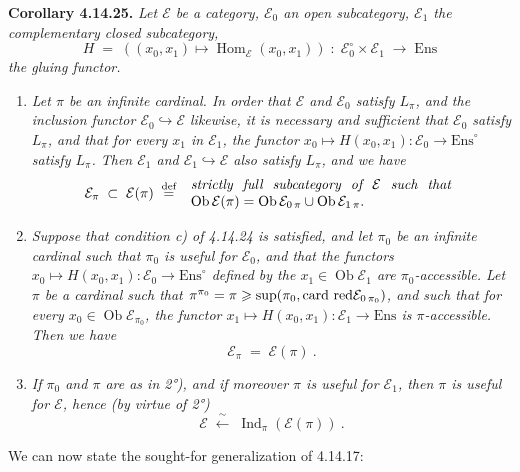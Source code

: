 \documentclass[11pt]{article}
\newcommand{\printedpage}[1]{\marginpar{\footnotesize p.~#1}}
\newcommand{\msp}[1]{\marginpar{\footnotesize [#1]}}
\newcommand{\cE}{\mathcal{E}}
\newcommand{\Ob}{\operatorname{Ob}}
\newcommand{\Hom}{\operatorname{Hom}}
\newcommand{\Ind}{\operatorname{Ind}}
\newcommand{\Ens}{\mathrm{Ens}}
\newcommand{\cardred}{\operatorname{card}\,\text{\upshape red}}
\newcommand{\defeq}{\overset{\text{\upshape def}}{=}}
\begin{document}
\textbf{Corollary 4.14.25.} \textit{Let $\cE$ be a category, $\cE_0$ an open subcategory, $\cE_1$ the complementary closed subcategory,}
\[
H \;=\; ((x_0,x_1) \longmapsto \Hom_{\cE}(x_0,x_1)) \;:\; \cE_0^\circ \times \cE_1 \;\longrightarrow\; \Ens
\]
\textit{the gluing functor.}
\begin{enumerate}
\item[\textit{1°)}] \textit{Let $\pi$ be an infinite cardinal. In order that $\cE$ and $\cE_0$ satisfy $L_\pi$, and the inclusion functor $\cE_0 \hookrightarrow \cE$ likewise, it is necessary and sufficient that $\cE_0$ satisfy $L_\pi$, and that for every $x_1$ in $\cE_1$, the functor $x_0 \longmapsto H(x_0,x_1) : \cE_0 \longrightarrow \Ens^\circ$ satisfy $L_\pi$. Then $\cE_1$ and $\cE_1 \hookrightarrow \cE$ also satisfy $L_\pi$,}
\msp{page 421}
\textit{and we have}
\[
\cE_\pi \;\subset\; \cE(\pi) \;\defeq\;
\begin{array}{l}
\text{\itshape strictly\ \ full\ \ subcategory\ \ of\ \ $\cE$\ \ such\ \ that}\\
\Ob\cE(\pi) = \Ob\cE_{0\,\pi} \cup \Ob\cE_{1\,\pi}.
\end{array}
\]
\item[\textit{2°)}] \textit{Suppose that condition c) of 4.14.24 is satisfied, and let $\pi_0$ be an infinite cardinal such that $\pi_0$ is useful for $\cE_0$, and that the functors $x_0 \longmapsto H(x_0,x_1) : \cE_0 \longrightarrow \Ens^\circ$ defined by the $x_1 \in \Ob\cE_1$ are $\pi_0$-accessible. Let $\pi$ be a cardinal such that $\pi^{\pi_0} = \pi \geqslant \sup(\pi_0, \cardred\cE_{0\,\pi_0})$, and such that for every $x_0 \in \Ob\cE_{\pi_0}$, the functor $x_1 \longmapsto H(x_0,x_1) : \cE_1 \longrightarrow \Ens$ is $\pi$-accessible. Then we have}
\[
\cE_\pi \;=\; \cE(\pi)\ .
\]

\printedpage{160}

\item[\textit{3°)}] \textit{If $\pi_0$ and $\pi$ are as in 2°), and if moreover $\pi$ is useful for $\cE_1$, then $\pi$ is useful for $\cE$, hence (by virtue of 2°)}
\[
\cE \;\xleftarrow{\ \sim\ }\; \Ind_\pi(\cE(\pi))\ .
\]
\end{enumerate}
We can now state the sought-for generalization of 4.14.17:
\end{document}
